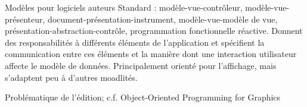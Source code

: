 \begin{block}{Modèles pour logiciels auteurs}
Standard : modèle-vue-contrôleur, modèle-vue-présenteur, document-présentation-instrument, modèle-vue-modèle de vue, présentation-abstraction-contrôle, programmation fonctionnelle réactive.
Donnent des responsabilités à différents éléments de l'application et spécifient la communication entre ces éléments et la manière dont une interaction utilisateur affecte le modèle de données.
Principalement orienté pour l'affichage, mais s'adaptent peu à d'autres moadlités.

Problématique de l'édition; c.f. Object-Oriented Programming for Graphics

\end{block}